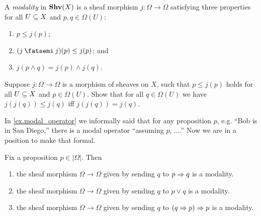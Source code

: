 \documentclass[7Sketches]{subfiles}
\begin{document}
\begin{definition}%
\label{def.modality}
A \emph{modality} in $\Shv(X)$ is a sheaf morphism $j\colon\Omega\to\Omega$ satisfying three properties for all $U\ss X$ and $p,q\in\Omega(U)$:
\begin{enumerate}[label=(\alph*)]
	\item $p\leq j(p)$; 
	\item $(j\cp j)(p)\leq j(p)$;	and
	\item $j(p\wedge q)=j(p)\wedge j(q)$.
\end{enumerate}
\end{definition}

\begin{exercise}%
\label{exc.two_defs_of_closure}
Suppose $j\colon\Omega\to\Omega$ is a morphism of sheaves on $X$, such that $p\leq j(p)$ holds for all $U\ss X$ and $p\in\Omega(U)$. Show that for all $q\in\Omega(U)$ we have $j(j(q))\leq j(q)$ iff $j(j(q))=j(q)$.
\end{exercise}



In \cref{ex.modal_operator} we informally said that for any proposition $p$, e.g. ``Bob is in San Diego,'' there is a modal operator ``assuming $p$, ....'' Now we are in a position to make that formal.

\begin{proposition}%
\label{prop.open_closed_quasiclosed}
Fix a proposition $p\in|\Omega|$. Then
\begin{enumerate}[label=(\alph*)]
	\item the sheaf morphism $\Omega\to\Omega$ given by sending $q$ to $p\imp q$ is a modality.
	\item the sheaf morphism $\Omega\to\Omega$ given by sending $q$ to $p\vee q$ is a modality.
	\item the sheaf morphism $\Omega\to\Omega$ given by sending $q$ to $(q\imp p)\imp p$ is a modality.
\end{enumerate}
\end{proposition}
\end{document}
